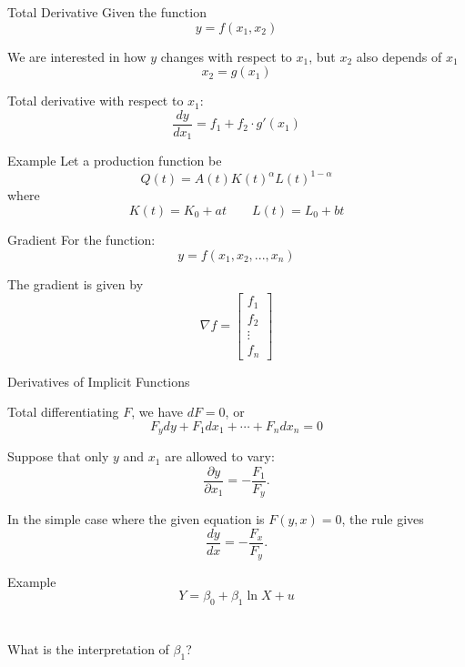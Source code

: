 \documentclass{./../../Latex/teaching_slides}
\begin{document}
\begin{frame}{Total Derivative}
Given the function 
\[ y = f(x_1, x_2) \]

We are interested in how $y$ changes with respect to $x_1$, but $x_2$ also depends of $x_1$
\[ x_2 = g(x_1) \]

Total derivative with respect to $x_1$:
\[ \frac{dy}{dx_1} =  f_1+f_2 \cdot g'(x_1)   \]

\end{frame}

\begin{frame}{Example}
Let a production function be
$$
Q(t) = A(t) K(t)^{\alpha} L(t)^{1-\alpha} 
$$
where 
$$
K(t) = K_0 + at  \quad \quad L(t) = L_0 + bt
$$
\end{frame}


\begin{frame}{Gradient}
For the function:
$$ y = f(x_1, x_2,...,x_n) $$ 
\vspace{0.5em}

The gradient is given by
$$ \nabla f = \begin{bmatrix}
	f_1 \\
	f_2 \\
	\vdots \\
	f_n
\end{bmatrix} $$
\end{frame}

\begin{frame}{Derivatives of Implicit Functions}

Total differentiating $F$, we have $d F=0$, or
$$
F_{y} d y+F_{1} d x_{1}+\cdots+F_{n} d x_{n}=0 
$$

\vspace{1em}
Suppose that only $y$ and $x_{1}$ are allowed to vary:
$$
\frac{\partial y}{\partial x_{1}}=-\frac{F_{1}}{F_{y}} .
$$

\vspace{1em}
In the simple case where the given equation is $F(y, x)=0$, the rule gives
$$
\frac{d y}{d x}=-\frac{F_{x}}{F_{y}} .
$$
\end{frame}

\begin{frame}{Example}
$$ Y = \beta_0 + \beta_1 \ln X + u $$ \\~\\

What is the interpretation of $\beta_1$?
\end{frame}
\end{document}
